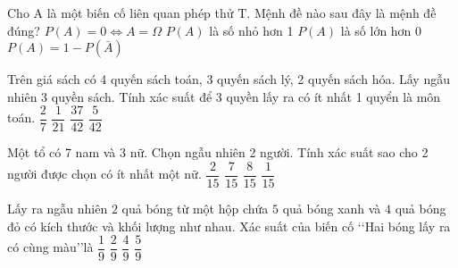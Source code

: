 \begin{ex}
	Cho $\mathrm{A}$ là một biến cố liên quan phép thử $\mathrm{T}$. Mệnh đề nào sau đây là mệnh đề đúng?
	\choice
	{\True $P(A)=0 \Leftrightarrow A=\Omega$}
	{$P(A)$ là số nhỏ hơn 1}
	{$P(A)$ là số lớn hơn 0}
	{\True $P(A)=1-P(\bar{A})$}
	\loigiai{
		
	}
\end{ex}

\begin{ex}
	Trên giá sách có 4 quyến sách toán, 3 quyến sách lý, 2 quyến sách hóa. Lấy ngẫu nhiên 3 quyền sách. Tính xác suất để 3 quyền lấy ra có ít nhất 1 quyển là môn toán.
	\choice
	{ $\dfrac{2}{7}$}
	{$\dfrac{1}{21}$}
	{\True $\dfrac{37}{42}$}
	{$\dfrac{5}{42}$}
\end{ex}

\begin{ex}
	Một tổ có 7 nam và 3 nữ. Chọn ngẫu nhiên 2 người. Tính xác suất sao cho 2 người được chọn có ít nhất một nữ.
	\choice
	{$\dfrac{2}{15}$}
	{$\dfrac{7}{15}$}
	{\True $\dfrac{8}{15}$}
	{$\dfrac{1}{15}$}
\end{ex}

\begin{ex}%
	Lấy ra ngẫu nhiên $2$ quả bóng từ một hộp chứa $5$ quả bóng xanh và $4$ quả bóng đỏ có kích thước và khối lượng như nhau. Xác suất của biến cố \lq\lq  Hai bóng lấy ra có cùng màu\rq\rq là
	\choice
	{$\dfrac{1}{9}$}
	{$\dfrac{2}{9}$}
	{\True $\dfrac{4}{9}$}
	{$\dfrac{5}{9}$}
\end{ex}

